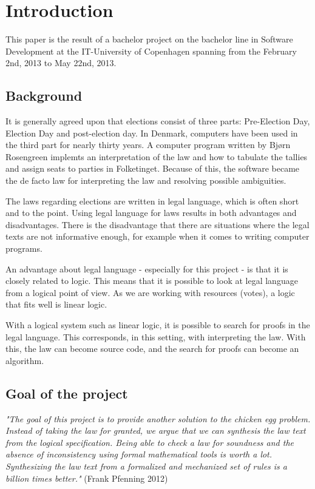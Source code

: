 \chapter{Introduction}
\label{01}

This paper is the result of a bachelor project on the bachelor line in Software Development at the IT-University of Copenhagen spanning from the February 2nd, 2013 to May 22nd, 2013.

\section{Background}
\label{01_01}

It is generally agreed upon that elections consist of three parts: Pre-Election Day, Election Day and post-election day. In Denmark, computers have been used in the third part for nearly thirty years. A computer program written by Bjørn Rosengreen implemts an interpretation of the law and how to tabulate the tallies and assign seats to parties in Folketinget. Because of this, the software became the de facto law for interpreting the law and resolving possible ambiguities.

The laws regarding elections are written in legal language, which is often short and to the point. Using legal language for laws results in both advantages and disadvantages. There is the disadvantage that there are situations where the legal texts are not informative enough, for example when it comes to writing computer programs.

An advantage about legal language - especially for this project - is that it is closely related to logic. This means that it is possible to look at legal language from a logical point of view. As we are working with resources (votes), a logic that fits well is linear logic.

With a logical system such as linear logic, it is possible to search for proofs in the legal language. This corresponds, in this setting, with interpreting the law. With this, the law can become source code, and the search for proofs can become an algorithm.

\section{Goal of the project}
\label{01_02}

\begin{texto2}
	\textit{"The goal of this project is to provide another solution to the chicken egg problem. Instead of taking the law for granted, we argue that we can synthesis the law text from the logical specification. Being able to check a law for soundness and the absence of inconsistency using formal mathematical tools is worth a lot. Synthesizing the law text from a formalized and mechanized set of rules is a billion times better."} (Frank Pfenning 2012)
\end{texto2}

